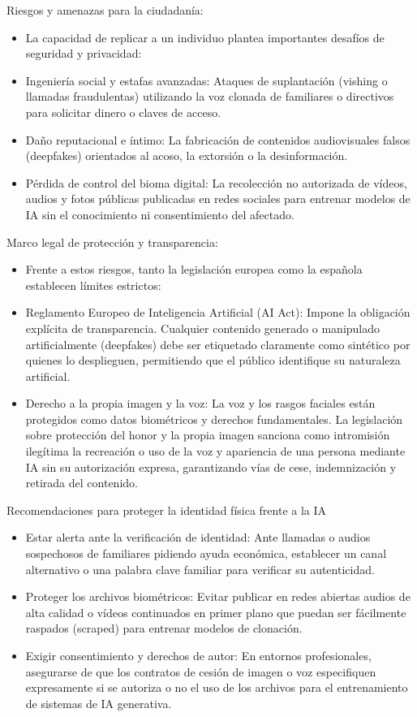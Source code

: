 \documentclass[
  spanish,
  a4paper,
  openany]{book}
\begin{document}
Riesgos y amenazas para la ciudadanía:

\begin{itemize}
\item
  La capacidad de replicar a un individuo plantea importantes desafíos de seguridad y privacidad:
\item
  Ingeniería social y estafas avanzadas: Ataques de suplantación (vishing o llamadas fraudulentas) utilizando la voz clonada de familiares o directivos para solicitar dinero o claves de acceso.
\item
  Daño reputacional e íntimo: La fabricación de contenidos audiovisuales falsos (deepfakes) orientados al acoso, la extorsión o la desinformación.
\item
  Pérdida de control del bioma digital: La recolección no autorizada de vídeos, audios y fotos públicas publicadas en redes sociales para entrenar modelos de IA sin el conocimiento ni consentimiento del afectado.
\end{itemize}

Marco legal de protección y transparencia:

\begin{itemize}
\item
  Frente a estos riesgos, tanto la legislación europea como la española establecen límites estrictos:
\item
  Reglamento Europeo de Inteligencia Artificial (AI Act): Impone la obligación explícita de transparencia. Cualquier contenido generado o manipulado artificialmente (deepfakes) debe ser etiquetado claramente como sintético por quienes lo desplieguen, permitiendo que el público identifique su naturaleza artificial.
\item
  Derecho a la propia imagen y la voz: La voz y los rasgos faciales están protegidos como datos biométricos y derechos fundamentales. La legislación sobre protección del honor y la propia imagen sanciona como intromisión ilegítima la recreación o uso de la voz y apariencia de una persona mediante IA sin su autorización expresa, garantizando vías de cese, indemnización y retirada del contenido.
\end{itemize}

Recomendaciones para proteger la identidad física frente a la IA

\begin{itemize}
\item
  Estar alerta ante la verificación de identidad: Ante llamadas o audios sospechosos de familiares pidiendo ayuda económica, establecer un canal alternativo o una palabra clave familiar para verificar su autenticidad.
\item
  Proteger los archivos biométricos: Evitar publicar en redes abiertas audios de alta calidad o vídeos continuados en primer plano que puedan ser fácilmente raspados (scraped) para entrenar modelos de clonación.
\item
  Exigir consentimiento y derechos de autor: En entornos profesionales, asegurarse de que los contratos de cesión de imagen o voz especifiquen expresamente si se autoriza o no el uso de los archivos para el entrenamiento de sistemas de IA generativa.
\end{itemize}
\end{document}
